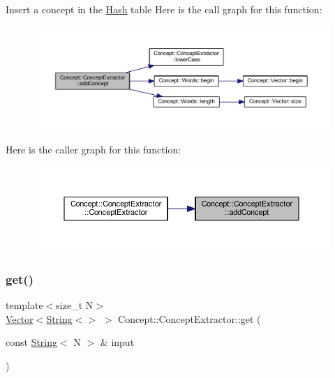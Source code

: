 Insert a concept in the \mbox{\hyperlink{class_concept_1_1_hash}{Hash}} table Here is the call graph for this function\+:\nopagebreak
\begin{figure}[H]
\begin{center}
\leavevmode
\includegraphics[width=350pt]{class_concept_1_1_concept_extractor_af42c1de7919fccadf14e33f48af3fb3a_cgraph}
\end{center}
\end{figure}
Here is the caller graph for this function\+:\nopagebreak
\begin{figure}[H]
\begin{center}
\leavevmode
\includegraphics[width=350pt]{class_concept_1_1_concept_extractor_af42c1de7919fccadf14e33f48af3fb3a_icgraph}
\end{center}
\end{figure}
\mbox{\label{class_concept_1_1_concept_extractor_a34afbe33a9c98d648df5976202ac05cf}} 
\subsubsection{\texorpdfstring{get()}{get()}}
{\footnotesize\ttfamily template$<$size\+\_\+t N$>$ \\
\mbox{\hyperlink{class_concept_1_1_vector}{Vector}}$<$\mbox{\hyperlink{class_concept_1_1_string}{String}}$<$$>$ $>$ Concept\+::\+Concept\+Extractor\+::get (\begin{DoxyParamCaption}\item[{const \mbox{\hyperlink{class_concept_1_1_string}{String}}$<$ N $>$ \&}]{input }\end{DoxyParamCaption})\hspace{0.3cm}{\ttfamily [inline]}}

